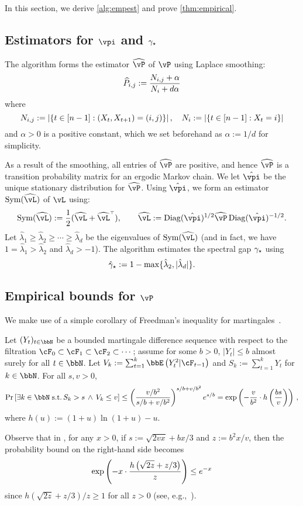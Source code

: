 In this section, we derive \cref{alg:empest} and prove
\cref{thm:empirical}.

\subsection{Estimators for $\vpi$ and $\gamma_{\star}$}

The algorithm forms the estimator $\wh\vP$ of $\vP$ using Laplace smoothing:
\[
  \widehat{P}_{i,j}
  := \frac{N_{i,j} + \alpha}{N_i + d\alpha}
\]
where
\[
  N_{i,j} := \left| \left\{ t \in [n-1] : (X_t,X_{t+1}) = (i,j) \right\} \right| ,
  \quad
  N_i := \left| \left\{ t \in [n-1] : X_t = i \right\} \right|
\]
and $\alpha>0$ is a positive constant, which we set beforehand as $\alpha := 1/d$
for simplicity.

As a result of the smoothing, all entries of $\wh\vP$ are positive,
and hence $\wh\vP$ is a transition probability
matrix for an ergodic Markov chain.
We let $\hat\vpi$ be the unique stationary distribution for $\wh\vP$.
Using $\hat\vpi$, we form an estimator $\Sym(\wh\vL)$ of $\vL$ using:
\[
  \Sym(\wh\vL) := \frac12 \parens{ \wh\vL + \wh\vL^\t }
  ,
  \qquad
  \wh\vL := \Diag(\hat\vpi)^{1/2} \wh\vP \Diag(\hat\vpi)^{-1/2}
  .
\]
Let $\hat\lambda_1 \geq \hat\lambda_2 \geq \dotsb \geq \hat\lambda_d$
be the eigenvalues of $\Sym(\wh\vL)$ (and in fact, we have $1 =
\hat\lambda_1 > \hat\lambda_2$ and $\hat\lambda_d > -1$).
The algorithm estimates the spectral gap $\gamma_{\star}$ using
\[
  \hat\gamma_{\star} := 1 - \max\{ \hat\lambda_2, |\hat\lambda_d| \} .
\]

\subsection{Empirical bounds for $\vP$}
\label{sec:P-obs-bound}

We make use of a simple corollary of Freedman's inequality for
martingales~\citep[Theorem 1.6]{Fre75}.
\begin{theorem}
  \label{thm:freedman}
  Let $(Y_t)_{t \in \bbN}$ be a bounded martingale difference sequence
  with respect to the filtration $\cF_0 \subset \cF_1 \subset \cF_2
  \subset \dotsb$; assume for some $b>0$, $|Y_t| \leq b$ almost surely
  for all $t \in \bbN$.
  Let $V_k := \sum_{t=1}^k \EE{Y_t^2|\cF_{t-1}}$ and $S_k :=
  \sum_{t=1}^k Y_t$ for $k \in \bbN$.
  For all $s, v > 0$,
  \[
    \Pr\Brackets{
      \exists k \in \bbN \;\st\,
      S_k > s
      \,\wedge\,
      V_k \leq v
    }
    \leq \Parens{
      \frac{v/b^2}{s/b+v/b^2}
    }^{s/b+v/b^2}
    e^{s/b}
    = \exp\Parens{
      -\frac{v}{b^2} \cdot h\Parens{\frac{bs}{v}}
    }
    \,,
  \]
  where $h(u) := (1+u)\ln(1+u) - u$.
\end{theorem}
Observe that in , for any $x>0$, if $s :=
\sqrt{2vx} + bx/3$ and $z := b^2x/v$, then the probability bound
on the right-hand side becomes
\[
  \exp\left(
    -x \cdot \frac{h\left(\sqrt{2z}+z/3\right)}{z}
  \right)
  \leq
  e^{-x}
\]
since $h(\sqrt{2z}+z/3)/z \geq 1$ for all $z > 0$ (see,
e.g.,~\citep[proof of Lemma 5]{audibert2009}).

